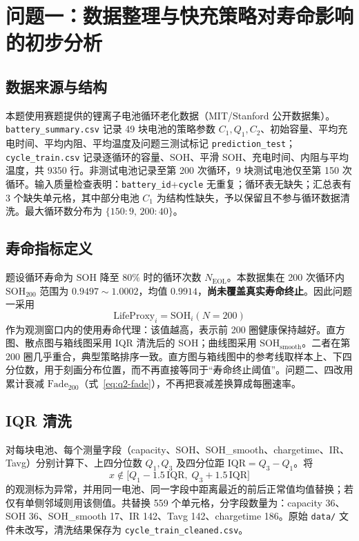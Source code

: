 \section{问题一：数据整理与快充策略对寿命影响的初步分析}

\subsection{数据来源与结构}

本题使用赛题提供的锂离子电池循环老化数据\cite{severson2019datadriven,matrdataset}（MIT\slash Stanford 公开数据集）。
\texttt{battery\_summary.csv} 记录 49 块电池的策略参数 \(C_1,Q_1,C_2\)、初始容量、平均充电时间、平均内阻、平均温度及问题三测试标记 \texttt{prediction\_test}；\texttt{cycle\_train.csv} 记录逐循环的容量、SOH、平滑 SOH、充电时间、内阻与平均温度，共 9350 行。非测试电池记录至第 200 次循环，9 块测试电池仅至第 150 次循环。输入质量检查表明：\texttt{battery\_id}+\texttt{cycle} 无重复；循环表无缺失；汇总表有 3 个缺失单元格，其中部分电池 \(C_1\) 为结构性缺失，予以保留且不参与循环数据清洗。最大循环数分布为 \(\{150:9,\,200:40\}\)。

\subsection{寿命指标定义}

题设循环寿命为 \(\mathrm{SOH}\) 降至 \(80\%\) 时的循环次数 \(N_{\mathrm{EOL}}\)。本数据集在 200 次循环内 \(\mathrm{SOH}_{200}\) 范围为 \(0.9497\sim 1.0002\)，均值 \(0.9914\)，\textbf{尚未覆盖真实寿命终止}。因此问题一采用
\begin{equation}
\mathrm{LifeProxy}_i=\mathrm{SOH}_{i}(N=200)
\label{eq:lifeproxy}
\end{equation}
作为观测窗口内的使用寿命代理：该值越高，表示前 200 圈健康保持越好。直方图、散点图与箱线图采用 IQR 清洗后的 \(\mathrm{SOH}\)；曲线图采用 \(\mathrm{SOH}_{\mathrm{smooth}}\)。二者在第 200 圈几乎重合，典型策略排序一致。直方图与箱线图中的参考线取样本上、下四分位数，用于刻画分布位置，而不再直接等同于“寿命终止阈值”。问题二、四改用累计衰减 \(\mathrm{Fade}_{200}\)（式~\eqref{eq:q2-fade}），不再把衰减差换算成每圈速率。

\subsection{IQR 清洗}

对每块电池、每个测量字段（capacity、SOH、SOH\_smooth、chargetime、IR、Tavg）分别计算下、上四分位数 \(Q_1,Q_3\) 及四分位距 \(\mathrm{IQR}=Q_3-Q_1\)。将
\[
x\notin\bigl[Q_1-1.5\,\mathrm{IQR},\; Q_3+1.5\,\mathrm{IQR}\bigr]
\]
的观测标为异常，并用同一电池、同一字段中距离最近的前后正常值均值替换；若仅有单侧邻域则用该侧值。共替换 559 个单元格，分字段数量为：capacity 36、SOH 36、SOH\_smooth 17、IR 142、Tavg 142、chargetime 186。原始 \texttt{data/} 文件未改写，清洗结果保存为 \texttt{cycle\_train\_cleaned.csv}。

